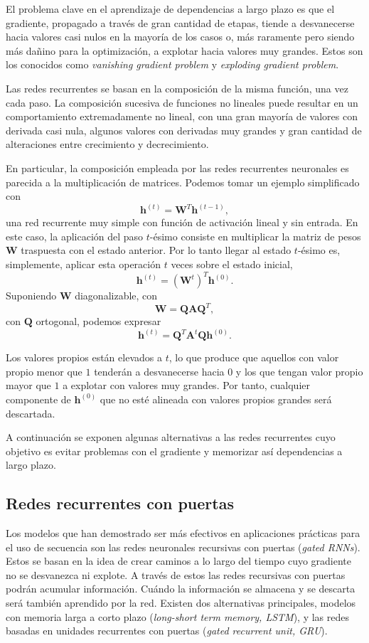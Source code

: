El problema clave en el aprendizaje de dependencias a largo plazo es que el gradiente, propagado a través de gran cantidad de etapas, tiende a desvanecerse hacia valores casi nulos en la mayoría de los casos o, más raramente pero siendo más dañino para la optimización, a explotar hacia valores muy grandes. Estos son los conocidos como \textit{vanishing gradient problem} y \textit{exploding gradient problem}.

Las redes recurrentes se basan en la composición de la misma función, una vez cada paso. La composición sucesiva de funciones no lineales puede resultar en un comportamiento extremadamente no lineal, con una gran mayoría de valores con derivada casi nula, algunos valores con derivadas muy grandes y gran cantidad de alteraciones entre crecimiento y decrecimiento.

En particular, la composición empleada por las redes recurrentes neuronales es parecida a la multiplicación de matrices. Podemos tomar un ejemplo simplificado con $$\textbf{h}^{(t)} = \textbf{W}^T\textbf{h}^{(t-1)},$$ una red recurrente muy simple con función de activación lineal y sin entrada. En este caso, la aplicación del paso $t$-ésimo consiste en multiplicar la matriz de pesos \textbf{W} traspuesta con el estado anterior. Por lo tanto llegar al estado $t$-ésimo es, simplemente, aplicar esta operación $t$ veces sobre el estado inicial, $$\textbf{h}^{(t)} = \left( \textbf{W}^t \right)^T \textbf{h}^{(0)}.$$ Suponiendo $\textbf{W}$ diagonalizable, con $$ \textbf{W} = \textbf{Q}\textbf{A}\textbf{Q}^T, $$ con $\textbf{Q}$ ortogonal, podemos expresar $$\textbf{h}^{(t)} = \textbf{Q}^T\textbf{A}^t\textbf{Q}\textbf{h}^{(0)}. $$

Los valores propios están elevados a $t$, lo que produce que aquellos con valor propio menor que $1$ tenderán a desvanecerse hacia 0 y los que tengan valor propio mayor que $1$ a explotar con valores muy grandes. Por tanto, cualquier componente de $\textbf{h}^{(0)}$ que no esté alineada con valores propios grandes será descartada.

A continuación se exponen algunas alternativas a las redes recurrentes cuyo objetivo es evitar problemas con el gradiente y memorizar así dependencias a largo plazo.

\subsection{Redes recurrentes con puertas}

Los modelos que han demostrado ser más efectivos en aplicaciones prácticas para el uso de secuencia son las redes neuronales recursivas con puertas (\textit{gated RNNs}). Estos se basan en la idea de crear caminos a lo largo del tiempo cuyo gradiente no se desvanezca ni explote. A través de estos las redes recursivas con puertas podrán acumular información. Cuándo la información se almacena y se descarta será también aprendido por la red. Existen dos alternativas principales, modelos con memoria larga a corto plazo (\textit{long-short term memory, LSTM}), y las redes basadas en unidades recurrentes con puertas (\textit{gated recurrent unit, GRU}).

